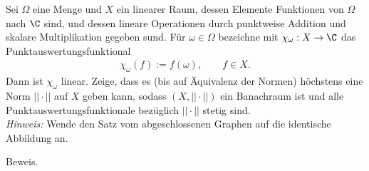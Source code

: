 \begin{exercise}
Sei $\Omega$ eine Menge und $X$ ein linearer Raum, dessen Elemente Funktionen von
$\Omega$ nach $\C$ sind, und dessen lineare Operationen durch punktweise Addition
und skalare Multiplikation gegeben sund. Für $\omega \in \Omega$ bezeichne mit
$\chi_{\omega}: X \rightarrow \C$ das Punktauswertungsfunktional
\begin{align*}
  \chi_{\omega}(f) := f(\omega), \qquad f \in X.
\end{align*}
Dann ist $\chi_{\omega}$ linear. Zeige, dass es (bis auf Äquivalenz der Normen)
höchstens eine Norm $||\cdot||$ auf $X$ geben kann, sodass $(X,||\cdot||)$ ein
Banachraum ist und alle Punktauswertungsfunktionale bezüglich $||\cdot||$ stetig sind. \\
\textit{Hinweis:} Wende den Satz vom abgeschlossenen Graphen auf die identische Abbildung an.
\end{exercise}
\begin{solution}
Beweis.
\end{solution}
